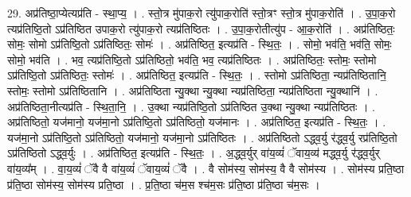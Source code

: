 \documentclass[17pt]{extarticle}
\begin{document}
29. अप्र॑तिष्ठा॒प्येत्यप्र॑ति - स्था॒प्य॒ । . स्तो॒त्र मु॑पाक॒रो त्यु॑पाक॒रोति॑ स्तो॒त्रꣳ स्तो॒त्र मु॑पाक॒रोति॑ । . उ॒पा॒क॒रो त्यप्र॑तिष्ठि॒तो ऽप्र॑तिष्ठित उपाक॒रो त्यु॑पाक॒रो त्यप्र॑तिष्ठितः । . उ॒पा॒क॒रोतीत्यु॑प - आ॒क॒रोति॑ । . अप्र॑तिष्ठितः॒ सोमः॒ सोमो ऽप्र॑तिष्ठि॒तो ऽप्र॑तिष्ठितः॒ सोमः॑ । . अप्र॑तिष्ठित॒ इत्यप्र॑ति - स्थि॒तः॒ । . सोमो॒ भव॑ति॒ भव॑ति॒ सोमः॒ सोमो॒ भव॑ति । . भव॒ त्यप्र॑तिष्ठि॒तो ऽप्र॑तिष्ठितो॒ भव॑ति॒ भव॒ त्यप्र॑तिष्ठितः । . अप्र॑तिष्ठितः॒ स्तोमः॒ स्तोमो ऽप्र॑तिष्ठि॒तो ऽप्र॑तिष्ठितः॒ स्तोमः॑ । . अप्र॑तिष्ठित॒ इत्यप्र॑ति - स्थि॒तः॒ । . स्तोमो ऽप्र॑तिष्ठिता॒ न्यप्र॑तिष्ठितानि॒ स्तोमः॒ स्तोमो ऽप्र॑तिष्ठितानि । . अप्र॑तिष्ठिता न्यु॒क्था न्यु॒क्था न्यप्र॑तिष्ठिता॒ न्यप्र॑तिष्ठिता न्यु॒क्थानि॑ । . अप्र॑तिष्ठिता॒नीत्यप्र॑ति - स्थि॒ता॒नि॒ । . उ॒क्था न्यप्र॑तिष्ठि॒तो ऽप्र॑तिष्ठित उ॒क्था न्यु॒क्था न्यप्र॑तिष्ठितः । . अप्र॑तिष्ठितो॒ यज॑मानो॒ यज॑मा॒नो ऽप्र॑तिष्ठि॒तो ऽप्र॑तिष्ठितो॒ यज॑मानः । . अप्र॑तिष्ठित॒ इत्यप्र॑ति - स्थि॒तः॒ । . यज॑मा॒नो ऽप्र॑तिष्ठि॒तो ऽप्र॑तिष्ठितो॒ यज॑मानो॒ यज॑मा॒नो ऽप्र॑तिष्ठितः । . अप्र॑तिष्ठितो ऽद्ध्व॒र्यु र॑द्ध्व॒र्यु रप्र॑तिष्ठि॒तो ऽप्र॑तिष्ठितो ऽद्ध्व॒र्युः । . अप्र॑तिष्ठित॒ इत्यप्र॑ति - स्थि॒तः॒ । . अ॒द्ध्व॒र्युर् वा॑य॒व्यं॑ ॅवाय॒व्य॑ मद्ध्व॒र्यु र॑द्ध्व॒र्युर् वा॑य॒व्य᳚म् । . वा॒य॒व्यं॑ ॅवै वै वा॑य॒व्यं॑ ॅवाय॒व्यं॑ ॅवै । . वै सोम॑स्य॒ सोम॑स्य॒ वै वै सोम॑स्य । . सोम॑स्य प्रति॒ष्ठा प्र॑ति॒ष्ठा सोम॑स्य॒ सोम॑स्य प्रति॒ष्ठा । . प्र॒ति॒ष्ठा च॑म॒स श्च॑म॒सः प्र॑ति॒ष्ठा प्र॑ति॒ष्ठा च॑म॒सः । \newline
\end{document}

